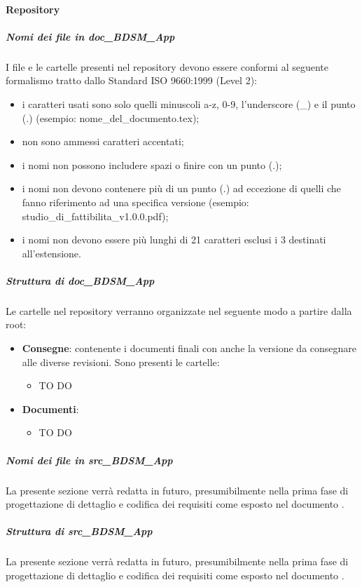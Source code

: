 			\paragraph{Repository}
				\subparagraph{Nomi dei file in doc\_BDSM\_App}
				I file e le cartelle presenti nel repository devono essere conformi al seguente formalismo tratto dallo Standard ISO 9660:1999 (Level 2):
					\begin{itemize}
						\item i caratteri usati sono solo quelli minuscoli a-z, 0-9, l'underscore (\_) e il punto (.) (esempio: nome\_del\_documento.tex);
						\item non sono ammessi caratteri accentati;
						\item i nomi non possono includere spazi o finire con un punto (.);
						\item i nomi non devono contenere più di un punto (.) ad eccezione di quelli che fanno riferimento ad una specifica versione (esempio: studio\_di\_fattibilita\_v1.0.0.pdf);
						\item i nomi non devono essere più lunghi di 21 caratteri esclusi i 3 destinati all'estensione.
					\end{itemize}

				\subparagraph{Struttura di doc\_BDSM\_App}
				Le cartelle nel repository verranno organizzate nel seguente modo a partire dalla root:
					\begin{itemize}
						\item \textbf{Consegne}: contenente i documenti finali con anche la versione da consegnare alle diverse revisioni. Sono presenti le cartelle:
							\begin{itemize}
								\item TO DO
							\end{itemize}
							
							
						\item \textbf{Documenti}:
							\begin{itemize}
								\item TO DO
							\end{itemize}
					\end{itemize}
					
				\subparagraph{Nomi dei file in src\_BDSM\_App}
				La presente sezione verrà redatta in futuro, presumibilmente nella prima fase di progettazione di dettaglio e codifica dei requisiti come esposto nel documento \docNameVersionPdP.
				\subparagraph{Struttura di src\_BDSM\_App}
				La presente sezione verrà redatta in futuro, presumibilmente nella prima fase di progettazione di dettaglio e codifica dei requisiti come esposto nel documento \docNameVersionPdP.

